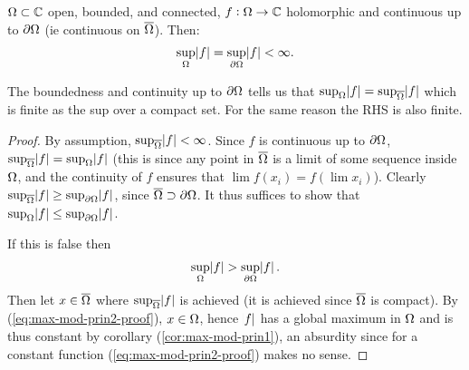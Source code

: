 \begin{corollary}\label{cor:max-mod-prin2}
$\Omega \subset \mathbb{C}$ open, bounded, and connected, $f:\Omega \rightarrow \mathbb{C}$ holomorphic and continuous up to $\partial \Omega$ (ie continuous on $\overline{\Omega}$). Then:
\begin{align*}
    \sup_{\Omega} \abs{f} = \sup_{\partial \Omega} \abs{f} < \infty.
\end{align*}
\end{corollary}
\begin{note}
The boundedness and continuity up to $\partial \Omega$ tells us that $\sup_{\Omega} \abs{f} = \sup_{\overline{\Omega}}\abs{f}$ which is finite as the sup over a compact set. For the same reason the RHS is also finite.
\end{note}

\begin{proof}
By assumption, $\sup_{\overline{\Omega}} \abs{f} < \infty$. Since $f$ is continuous up to $\partial \Omega$, $\sup_{\overline{\Omega}} \abs{f} = \sup_{\Omega} \abs{f}$ (this is since any point in $\overline{\Omega}$ is a limit of some sequence inside $\Omega$, and the continuity of $f$ ensures that $\lim f(x_i) = f(\lim x_i)$). Clearly $\sup_{\overline{\Omega}} \abs{f} \geq \sup_{\partial \Omega} \abs{f}$, since $\overline{\Omega} \supset \partial \Omega$. It thus suffices to show that $\sup_{\Omega} \abs{f} \leq \sup_{\partial \Omega} \abs{f}$.

If this is false then
\begin{align}\label{eq:max-mod-prin2-proof}
    \sup_{\Omega} \abs{f} > \sup_{\partial \Omega} \abs{f}.
\end{align}
Then let $x \in \overline{\Omega}$ where $\sup_{\overline{ \Omega}} \abs{f} $ is achieved (it is achieved since $\overline{\Omega}$ is compact). By (\ref{eq:max-mod-prin2-proof}), $x \in \Omega$, hence $\abs{f}$ has a global maximum in $\Omega$ and is thus constant by corollary (\ref{cor:max-mod-prin1}), an absurdity since for a constant function (\ref{eq:max-mod-prin2-proof}) makes no sense.
\end{proof}
























